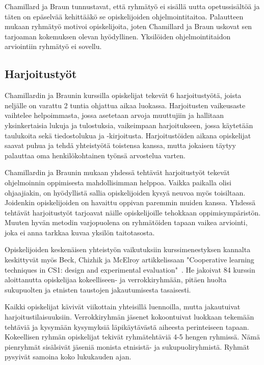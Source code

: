 \documentclass[finnish]{../tktltiki2}
\theoremstyle{definition}
\theoremstyle{remark}
\begin{document}
Chamillard ja Braun tunnustavat, että ryhmätyö ei sisällä uutta opetussisältöä ja täten on epäselvää kehittääkö se opiskelijoiden ohjelmointitaitoa. Palautteen mukaan ryhmätyö motivoi opiskelijoita, joten Chamillard ja Braun uskovat sen tarjoaman kokemuksen olevan hyödyllinen. Yksilöiden ohjelmointitaidon arviointiin ryhmätyö ei sovellu.

\subsection{Harjoitustyöt}

Chamillardin ja Braunin kurssilla opiskelijat tekevät 6 harjoitustyötä, joista neljälle on varattu 2 tuntia ohjattua aikaa luokassa. Harjoitusten vaikeusaste vaihtelee helpoimmasta, jossa asetetaan arvoja muuttujiin ja hallitaan yksinkertaisia lukuja ja tulostuksia, vaikeimpaan harjoitukseen, jossa käytetään taulukoita sekä tiedostolukua ja -kirjoitusta. Harjoitustöiden aikana opiskelijat saavat puhua ja tehdä yhteistyötä toistensa kanssa, mutta jokaisen täytyy palauttaa oma henkilökohtainen työnsä arvostelua varten.

Chamillardin ja Braunin mukaan yhdessä tehtävät harjoitustyöt tekevät ohjelmoinnin oppimisesta mahdollisimman helppoa. Vaikka paikalla olisi ohjaajiakin, on hyödyllistä sallia opiskelijoiden kysyä neuvoa myös toisiltaan. Joidenkin opiskelijoiden on havaittu oppivan paremmin muiden kanssa. Yhdessä tehtävät harjoitustyöt tarjoavat näille opiskelijoille tehokkaan oppimisympäristön. Muuten hyvän metodin varjopuolena on ryhmätöiden tapaan vaikea arviointi, joka ei anna tarkkaa kuvaa yksilön taitotasosta.

Opiskelijoiden keskenäisen yhteistyön vaikutuksiin kurssimenestyksen kannalta keskittyvät myös Beck, Chizhik ja McElroy artikkelissaan "Cooperative learning techniques in CS1: design and experimental evaluation"~\cite{BCM05}. He jakoivat 84 kurssin aloittanutta opiskelijaa kokeelliseen- ja verrokkiryhmään, pitäen huolta sukupuolten ja etnisten taustojen jakautumisesta tasaisesti.

Kaikki opiskelijat kävivät viikottain yhteisillä luennoilla, mutta jakautuivat harjoitustilaisuuksiin. Verrokkiryhmän jäsenet kokoontuivat luokkaan tekemään tehtäviä ja kysymään kysymyksiä läpikäytävästä aiheesta perinteiseen tapaan. Kokeellisen ryhmän opiskelijat tekivät ryhmätehtäviä 4-5 hengen ryhmissä. Nämä pienryhmät sisälsivät jäseniä monista etnisistä- ja sukupuoliryhmistä. Ryhmät pysyivät samoina koko lukukauden ajan.
\end{document}
